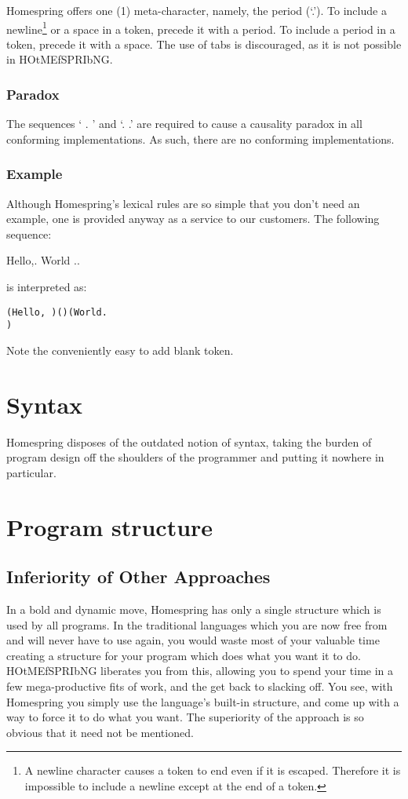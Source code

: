\documentclass[10pt]{article}
\begin{document}
Homespring offers one (1) meta-character, namely, the period (`.'). To include a newline\footnote{A newline character causes a token to end even if it is escaped. Therefore it is impossible to include a newline except at the end of a token.} or a space in a token, precede it with a period. To include a period in a token, precede it with a space. The use of tabs is discouraged, as it is not possible in HOtMEfSPRIbNG.

\subsubsection{Paradox}

The sequences `  . ' and `. .' are required to cause a causality paradox in all conforming implementations. As such, there are no conforming implementations.

\subsubsection{Example}

Although Homespring's lexical rules are so simple that you don't need an example, one is provided anyway as a service to our customers. The following sequence:

Hello,.   World ..

is interpreted as:

\begin{verbatim}
(Hello, )()(World.
)
\end{verbatim}

Note the conveniently easy to add blank token.

\section{Syntax}

Homespring disposes of the outdated notion of syntax, taking the burden of program design off the shoulders of the programmer and putting it nowhere in particular.

\section{Program structure}

\subsection{Inferiority of Other Approaches}

In a bold and dynamic move, Homespring has only a single structure which is used by all programs. In the traditional languages which you are now free from and will never have to use again, you would waste most of your valuable time creating a structure for your program which does what you want it to do. HOtMEfSPRIbNG liberates you from this, allowing you to spend your time in a few mega-productive fits of work, and the get back to slacking off. You see, with Homespring you simply use the language's built-in structure, and come up with a way to force it to do what you want. The superiority of the approach is so obvious that it need not be mentioned.
\end{document}
